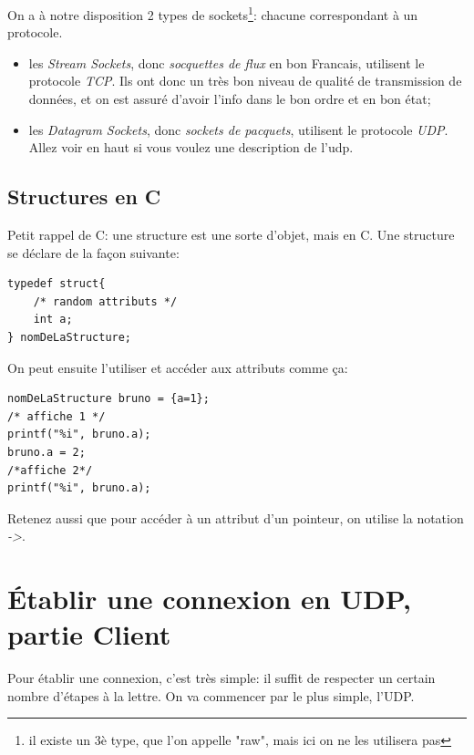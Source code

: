 \documentclass{report}
\begin{document}
On a à notre disposition 2 types de sockets\footnote{il existe un 3è type, que l'on appelle "raw", mais ici on ne les utilisera pas}: chacune correspondant à un protocole.
\begin{itemize}
\item{les \emph{Stream Sockets}, donc \emph{socquettes de flux} en bon Francais, utilisent le protocole \emph{TCP}. Ils ont donc un très bon niveau de qualité de transmission de données, et on est assuré d'avoir l'info dans le bon ordre et en bon état;}
\item{les \emph{Datagram Sockets}, donc \emph{sockets de pacquets}, utilisent le protocole \emph{UDP}. Allez voir en haut si vous voulez une description de l'udp.}
\end{itemize}

\subsection{Structures en C}
Petit rappel de C: une structure est une sorte d'objet, mais en C. Une structure se déclare de la façon suivante:
\begin{lstlisting}
typedef struct{
	/* random attributs */
	int a;
} nomDeLaStructure;
\end{lstlisting}
On peut ensuite l'utiliser et accéder aux attributs comme ça:
\begin{lstlisting}
nomDeLaStructure bruno = {a=1};
/* affiche 1 */
printf("%i", bruno.a);
bruno.a = 2;
/*affiche 2*/
printf("%i", bruno.a);
\end{lstlisting}
Retenez aussi que pour accéder à un attribut d'un pointeur, on utilise la notation \emph{->}.


\section{Établir une connexion en UDP, partie Client} 
Pour établir une connexion, c'est très simple: il suffit de respecter un certain nombre d'étapes à la lettre. On va commencer par le plus simple, l'UDP.
\end{document}
